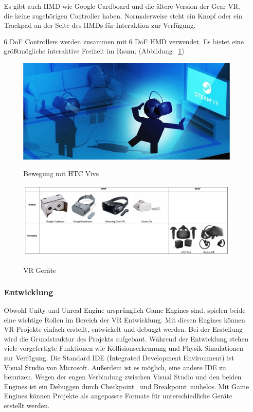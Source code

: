   Es gibt auch HMD wie Google Cardboard und die ältere Version der Gear VR, die keine zugehörigen Controller haben. Normalerweise steht ein Knopf oder ein Trackpad an der Seite des HMDs für Interaktion zur Verfügung.
  
  6 DoF Controllers werden zusammen mit 6 DoF HMD verwendet. Es bietet eine größtmögliche interaktive Freiheit im Raum. (Abbildung ~\ref{fig:6dcontroller})
  
\begin{figure}[ht]
\vspace*{1em}
\centering
\caption{Bewegung mit HTC Vive}
\includegraphics[width=\textwidth]{images/6dcontroller.jpg}
\label{fig:6dcontroller} 
\end{figure}

\begin{figure}[ht]
\vspace*{1em}
\centering
\caption{VR Geräte}
\includegraphics[width=\textwidth]{images/vrDevicesTableCorrect.png}
\label{fig:vrDevicesTable} 
\end{figure}
  
  \subsubsection{Entwicklung}
  Obwohl Unity und Unreal Engine ursprünglich Game Engines sind, spielen beide eine wichtige Rollen im Bereich der VR Entwicklung. Mit diesen Engines können VR Projekte einfach erstellt, entwickelt und debuggt werden. Bei der Erstellung wird die Grundstruktur des Projekts aufgebaut. Während der Entwicklung stehen viele vorgefertigte Funktionen wie Kollisionserkennung und Physik-Simulationen zur Verfügung. Die Standard IDE (Integrated Development Environment) ist Visual Studio von Microsoft. Außerdem ist es möglich, eine andere IDE zu benutzen. Wegen der engen Verbindung zwischen Visual Studio und den beiden Engines ist ein Debuggen durch \glqq Checkpoint \grqq\ und \glqq Breakpoint\grqq\ mühelos. Mit Game Engines können Projekte als angepasste Formate für unterschiedliche Geräte erstellt werden.

